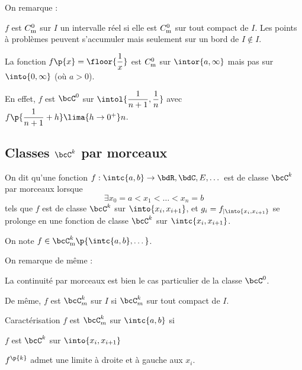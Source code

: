 \documentclass[a4paper,french,bookmarks]{book}
\begin{document}
    On remarque :
    \begin{enumerate}
        \itt $f$ est $C^0_\text m$ sur $I$ un intervalle réel si elle est $C^0_\text m$ sur tout compact de $I$. Les points à problèmes peuvent s'accumuler mais seulement sur un bord de $I \not\in I$.
    \end{enumerate}
    
    \begin{example}{}{}
        La fonction $f\p{x} = \floor{\dfrac{1}{x}}$ est $C^0_\text m$ sur $\intor{a, \infty}$ mais pas sur $\into{0, \infty}$ (où $a > 0$).
        
        En effet, $f$ est $\bcC^0$ sur $\intol{\dfrac{1}{n+1}, \dfrac{1}{n}}$ avec $f\p{\dfrac{1}{n+1} + h} \lima{h \to 0^+} n$.
    \end{example}
    
    \subsection{Classes $\bcC^k$ par morceaux}
    
    \begin{definition}{}{}
        On dit qu'une fonction $f : \intc{a, b} \to \bdR, \bdC, E, \dots$ est de classe $\bcC^k$ par morceaux lorsque 
        \[ \exists x_0 = a < x_1 < \dots < x_n = b\]
        tels que $f$ est de classe $\bcC^k$ sur $\into{x_i, x_{i+1}}$, et $g_i = f_{\vert \into{x_i, x_{i+1}}}$ se prolonge en une fonction de classe $\bcC^k$ sur $\intc{x_i, x_{i+1}}$.
    \end{definition}
    \begin{notation}
        On note $f \in \bcC^k_\text m\p{\intc{a, b}, \dots}$.
    \end{notation}
    
    On remarque de même :
    \begin{enumerate}
        \itt La continuité par morceaux est bien le cas particulier de la classe $\bcC^0$.
        
        \itt De même, $f$ est $\bcC_m^k$ sur $I$ si $\bcC_m^k$ sur tout compact de $I$.
    \end{enumerate}
    
    \begin{theorem}{Caractérisation}{}
        $f$ est $\bcC_m^k$ sur $\intc{a, b}$ si
        \begin{enumerate}
            \itast $f$ est $\bcC^k$ sur $\into{x_i, x_{i+1}}$
            
            \itast $f^{\p{k}}$ admet une limite à droite et à gauche aux $x_i$.
        \end{enumerate}
    \end{theorem}
    
\end{document}
